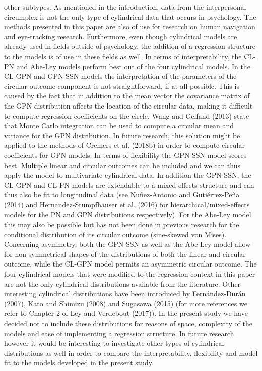 \documentclass[man]{apa6}
\begin{document}
other subtypes.\newline
\indent As mentioned in the introduction, data from the interpersonal circumplex
is not the only type of cylindrical data that occurs in psychology. The methods
presented in this paper are also of use for research on human navigation and
eye-tracking research. Furthermore, even though cylindrical models are already
used in fields outside of psychology, the addition of a regression structure to
the models is of use in these fields as well. \newline
\indent In terms of interpretability, the CL-PN and Abe-Ley models perform
best out of the four cylindrical models. In the
CL-GPN and GPN-SSN models the interpretation of the parameters of the
circular outcome component is not straightforward, if at all possible.
This is caused by the fact that in addition to the mean vector the
covariance matrix of the GPN distribution affects the location of the
circular data, making it difficult to compute regression coefficients on
the circle. Wang and Gelfand (2013) state that Monte Carlo integration
can be used to compute a circular mean and variance for the GPN
distribution. In future research, this solution might be applied to the
methods of Cremers et al. (2018b) in order to compute circular
coefficients for GPN models.\newline
\indent In terms of flexibility the GPN-SSN model scores best. Multiple
linear and circular outcomes can be included and we can thus apply the
model to multivariate cylindrical data. In addition the GPN-SSN, the
CL-GPN and CL-PN models are extendable to a mixed-effects structure and
can thus also be fit to longitudinal data (see Nuñez-Antonio and Gutiérrez-Peña (2014) and Hernandez-Stumpfhauser et al. (2016) for
hierarchical/mixed-effects models for the PN and GPN distributions
respectively). For the Abe-Ley model this may also be possible but has
not been done in previous research for the conditional distribution of
its circular outcome (sine-skewed von
Mises). Concerning asymmetry, both the
GPN-SSN as well as the Abe-Ley model allow for non-symmetrical shapes of
the distributions of both the linear and circular outcome, while the CL-GPN
model permits an asymmetric circular outcome.\newline
\indent The four cylindrical models that were modified to the regression
context in this paper are not the only cylindrical distributions
available from the literature. Other interesting cylindrical distributions have been introduced by
Fernández-Durán (2007), Kato and Shimizu (2008) and Sugasawa (2015) (for more references we
refer to Chapter 2 of Ley and Verdebout (2017)). In the present study we
have decided not to include these distributions for reasons of space,
complexity of the models and ease of implementing a regression
structure. In future research however it would be interesting to
investigate other types of cylindrical distributions as well in order to
compare the interpretability, flexibility and model fit to the models
developed in the present study.\newline
\end{document}
